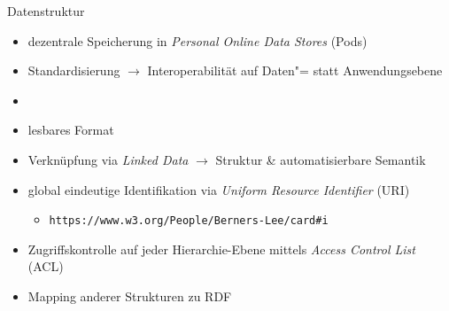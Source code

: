 \begin{frame}{Datenstruktur}
    \begin{itemize}
        \item dezentrale Speicherung in \emph{Personal Online Data Stores} (Pods)~\cite{mecklerWebLinkedData2023,sambraSolidPlatformDecentralized2016}
        \item Standardisierung $\to$ Interoperabilität auf Daten"= statt Anwendungsebene
        
        
        \item {}
        
        \pause
        \pause
        \item lesbares Format 
        
        \pause
        \pause
        \item Verknüpfung via \emph{Linked Data} $\to$ Struktur \& automatisierbare Semantik~\cite{bizerLinkedDataStory2009,mecklerWebLinkedData2023}

        \pause
        \item global eindeutige Identifikation via \emph{Uniform Resource Identifier} (URI)~\cite{sambraSolidPlatformDecentralized2016}
        \begin{itemize}
            \item \texttt{https://www.w3.org/People/Berners-Lee/card\#i}~\cite{bizerLinkedDataStory2009}
        \end{itemize}
        
        \pause
        \item Zugriffskontrolle auf jeder Hierarchie-Ebene mittels \emph{Access Control List} (ACL)
        
        \pause
        \item Mapping anderer Strukturen zu RDF~\cite{mecklerWebLinkedData2023,sambraSolidPlatformDecentralized2016}
    \end{itemize}
\end{frame}


